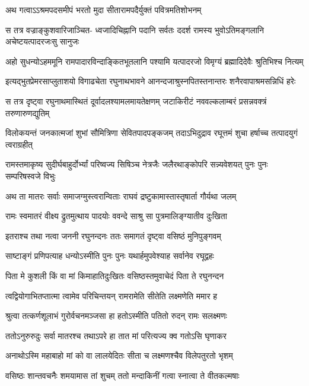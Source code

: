 \twolineshloka
{अथ गत्वाऽऽश्रमपदसमीपं भरतो मुदा}
{सीतारामपदैर्युक्तं पवित्रमतिशोभनम्} %

\fourlineindentedshloka
{स तत्र वज्राङ्कुशवारिजाञ्चित-}
{ध्वजादिचिह्नानि पदानि सर्वतः}
{ददर्श रामस्य भुवोऽतिमङ्गलानि}
{अचेष्टयत्पादरजःसु सानुजः} %

\fourlineindentedshloka
{अहो सुधन्योऽहममूनि}
{रामपादारविन्दाङ्कितभूतलानि}
{पश्यामि यत्पादरजो विमृग्यं}
{ब्रह्मादिदेवैः श्रुतिभिश्च नित्यम्} %

\fourlineindentedshloka
{इत्यद्भुतप्रेमरसाप्लुताशयो}
{विगाढचेता रघुनाथभावने}
{आनन्दजाश्रुस्नपितस्तनान्तरः}
{शनैरवापाश्रमसन्निधिं हरेः} %

\fourlineindentedshloka
{स तत्र दृष्ट्वा रघुनाथमास्थितं}
{दूर्वादलश्यामलमायतेक्षणम्}
{जटाकिरीटं नववल्कलाम्बरं}
{प्रसन्नवक्त्रं तरुणारुणद्युतिम्} %

\fourlineindentedshloka
{विलोकयन्तं जनकात्मजां शुभां}
{सौमित्रिणा सेवितपादपङ्कजम्}
{तदाऽभिदुद्राव रघूत्तमं शुचा}
{हर्षाच्च तत्पादयुगं त्वराग्रहीत्} %

\fourlineindentedshloka
{रामस्तमाकृष्य सुदीर्घबाहुर्दोर्भ्यां}
{परिष्वज्य सिषिञ्च नेत्रजैः}
{जलैरथाङ्कोपरि सन्न्यवेशयत्}
{पुनः पुनः सम्परिषस्वजे विभुः} %

\twolineshloka
{अथ ता मातरः सर्वाः समाजग्मुस्त्वरान्विताः}
{राघवं द्रष्टुकामास्तास्तृषार्ता गौर्यथा जलम्} %

\twolineshloka
{रामः स्वमातरं वीक्ष्य द्रुतमुत्थाय पादयोः}
{ववन्दे साश्रु सा पुत्रमालिङ्ग्यातीव दुःखिता} %

\twolineshloka
{इतराश्च तथा नत्वा जननी रघुनन्दनः}
{ततः समागतं दृष्ट्वा वसिष्ठं मुनिपुङ्गवम्} %

\twolineshloka
{साष्टाङ्गं प्रणिपत्याह धन्योऽस्मीति पुनः पुनः}
{यथार्हमुपवेश्याह सर्वानेव रघूद्वहः} %

\twolineshloka
{पिता मे कुशली किं वा मां किमाहातिदुःखितः}
{वसिष्ठस्तमुवाचेदं पिता ते रघुनन्दन} %

\twolineshloka
{त्वद्वियोगाभितप्तात्मा त्वामेव परिचिन्तयन्}
{रामरामेति सीतेति लक्ष्मणेति ममार ह} %

\twolineshloka
{श्रुत्वा तत्कर्णशूलाभं गुरोर्वचनमञ्जसा}
{हा हतोऽस्मीति पतितो रुदन् रामः सलक्ष्मणः} %

\twolineshloka
{ततोऽनुरुरुदुः सर्वा मातरश्च तथाऽपरे}
{हा तात मां परित्यज्य क्व गतोऽसि घृणाकर} %

\twolineshloka
{अनाथोऽस्मि महाबाहो मां को वा लालयेदितः}
{सीता च लक्ष्मणश्चैव विलेपतुरतो भृशम्} %

\twolineshloka
{वसिष्ठः शान्तवचनैः शमयामास तां शुचम्}
{ततो मन्दाकिनीं गत्वा स्नात्वा ते वीतकल्मषाः} %

